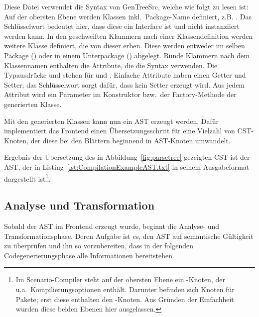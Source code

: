 Diese Datei verwendet die Syntax von GenTreeSrc, welche wie folgt zu lesen ist:
Auf der obersten Ebene werden Klassen inkl.\ Package-Name definiert, z.B. . %
Das Schlüsselwort  bedeutet hier, dass diese ein Interface ist und nicht instanziiert werden kann.
In den geschweiften Klammern nach einer Klassendefinition werden weitere Klasse definiert, die von dieser erben.
Diese werden entweder im selben Package () oder in einem Unterpackage
() abgelegt.
Runde Klammern nach dem Klassennamen enthalten die Attribute, die die Syntax  verwenden.
Die Typausdrücke \code{[T]} und \code{[T:U]} stehen für  und .
Einfache Attribute haben einen Getter und Setter;
das Schlüsselwort  sorgt dafür, dass kein Setter erzeugt wird.
Aus jedem Attribut wird ein Parameter im Konstruktor bzw.\ der Factory-Methode der generierten Klasse.

Mit den generierten Klassen kann nun ein AST erzeugt werden.
Dafür implementiert das Frontend einen Übersetzungsschritt für eine Vielzahl von CST-Knoten,
der diese bei den Blättern beginnend in AST-Knoten umwandelt.

Ergebnis der Übersetzung des in Abbildung~\ref{fig:parsetree} gezeigten CST ist der AST,
der in Listing~\ref{lst:CompilationExampleAST.txt} in seinem Ausgabeformat dargestellt ist\footnote{
    Im Scenario-Compiler steht auf der obersten Ebene ein -Knoten, der u.a.\ Kompilierungsoptionen enthält.
    Darunter befinden sich Knoten für Pakete;
    erst diese enthalten den -Knoten.
    Aus Gründen der Einfachheit wurden diese beiden Ebenen hier ausgelassen.
}.


\subsection{Analyse und Transformation}\label{subsec:data-model-gentreesrc}

Sobald der AST im Frontend erzeugt wurde, beginnt die Analyse- und Transformationsphase.
Deren Aufgabe ist es, den AST auf semantische Gültigkeit zu überprüfen und ihn so vorzubereiten,
dass in der folgenden Codegenerierungsphase alle Informationen bereitstehen.

